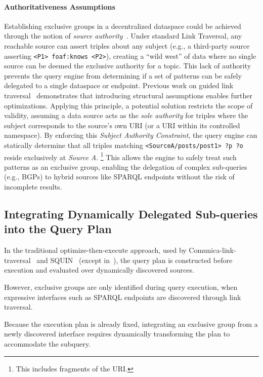 \documentclass{ceurart}
\theoremstyle{definition}
\begin{document}
\paragraph{Authoritativeness Assumptions}
Establishing exclusive groups in a decentralized dataspace could be achieved through 
the notion of \emph{source authority}~\cite{bogaerts2024distributed,haller2020links,hogan2009scalable}.
Under standard Link Traversal, any reachable source can assert triples about any subject
(e.g., a third-party source asserting \texttt{<P1> foaf:knows <P2>}), creating a ``wild west'' of data where 
no single source can be deemed the exclusive authority for a topic.
This lack of authority prevents the query engine from determining if a set of patterns can be safely delegated to a single dataspace or endpoint.
Previous work on guided link traversal~\cite{verborgh2020guided} demonstrates that introducing structural assumptions enables 
further optimizations. 
Applying this principle, a potential solution restricts the scope of validity, assuming a data source acts as the \emph{sole authority}
for triples where the subject corresponds to the source's own URI (or a URI within its controlled namespace).
By enforcing this \emph{Subject Authority Constraint}, the query engine can 
statically determine that all triples matching \texttt{<SourceA/posts/post1> ?p ?o} reside exclusively at \emph{Source A}.
\footnote{This includes fragments of the URI.}
This allows the engine to safely treat such patterns as an exclusive group, 
enabling the delegation of complex sub-queries (e.g., BGPs) to hybrid sources like SPARQL endpoints without the risk of incomplete results.

\subsection{Integrating Dynamically Delegated Sub-queries into the Query Plan}
In the traditional optimize-then-execute approach, 
used by Comunica-link-traversal~\cite{taelman2018comunica,taelman2023link} and SQUIN~\cite{hartig2013squin} (except in~\cite{hartig2016walking}),
the query plan is constructed before execution and evaluated over dynamically discovered sources.

However, exclusive groups are only identified during query execution,
when expressive interfaces such as SPARQL endpoints are discovered through link traversal.

Because the execution plan is already fixed,
integrating an exclusive group from a newly discovered interface requires dynamically transforming the plan to accommodate the subquery.
\end{document}
